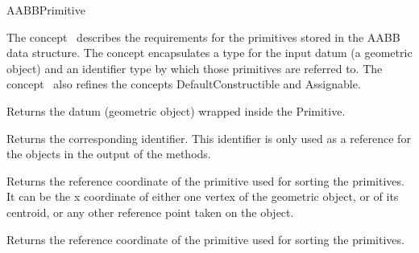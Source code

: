 \ccRefPageBegin


\begin{ccRefConcept}{AABBPrimitive}


\ccDefinition
  
The concept \ccRefName\ describes the requirements for the primitives stored in the AABB data structure. The concept encapsulates a type for the input datum (a geometric object) and an identifier type by which those primitives are referred to. The concept \ccRefName\ also refines the concepts DefaultConstructible and Assignable.

\ccTypes






\ccOperations

{Returns the datum (geometric object) wrapped inside the Primitive.}

{Returns the corresponding identifier. This identifier is only used as a reference for the objects in the output of the  methods.}

{Returns the  reference coordinate of the primitive used for sorting the primitives. It can be the x coordinate of either one vertex of the geometric object, or of its centroid, or any other reference point taken on the object.}

{Returns the  reference coordinate of the primitive used for sorting the primitives.}


\end{ccRefConcept}
